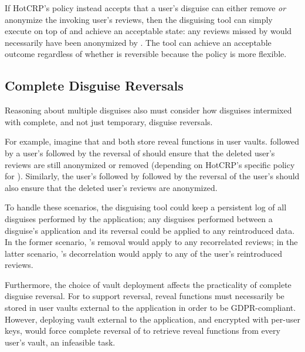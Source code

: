If HotCRP's policy instead accepts that a user's \gdpr disguise can either remove \emph{or}
anonymize the invoking user's reviews, then the disguising tool can simply execute \gdpr on top of
\ca and achieve an acceptable state: any reviews missed by \gdpr would necessarily have been
anonymized by \ca.  The tool can achieve an acceptable outcome regardless of whether \ca is
reversible because the policy is more flexible.

\subsection{Complete Disguise Reversals}
Reasoning about multiple disguises also must consider how disguises intermixed with
complete, and not just temporary, disguise reversals.

For example, imagine that \ca and \gdpr both store reveal functions in user vaults. 
%
\ca followed by a user's \gdpr followed by the reversal of \ca should ensure that the deleted user's
reviews are still anonymized or removed (depending on HotCRP's specific policy for \gdpr).
Similarly, the user's \gdpr followed by \ca followed by the reversal of the user's \gdpr should also
ensure that the deleted user's reviews are anonymized.

To handle these scenarios, the disguising tool could keep a persistent log of all disguises
performed by the application; any disguises performed between a disguise's application and its
reversal could be applied to any reintroduced data. In the former scenario, \gdpr's removal would
apply to any recorrelated reviews; in the latter scenario, \ca's decorrelation would apply to any of
the user's reintroduced reviews.

Furthermore, the choice of vault deployment affects the practicality of complete disguise reversal.
For \gdpr to support reversal, reveal functions must necessarily be stored in user vaults external
to the application in order to be GDPR-compliant.
However, deploying vault external to the application, and encrypted with per-user keys, would force complete reversal of \ca to retrieve reveal functions from every user's vault, an infeasible task.
